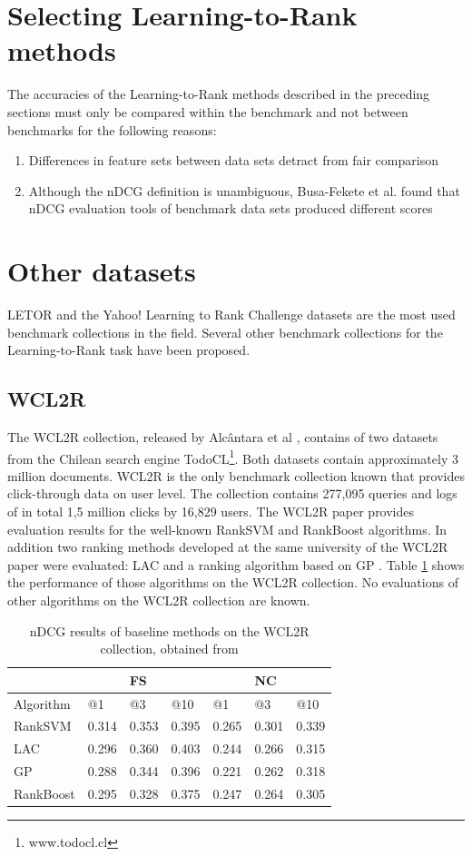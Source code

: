 \section{Selecting Learning-to-Rank methods}
The accuracies of the Learning-to-Rank methods described in the preceding sections must only be compared within the benchmark and not between benchmarks for the following reasons:
\begin{enumerate}
\item Differences in feature sets between data sets detract from fair comparison
\item Although the \ac{nDCG} definition is unambiguous, Busa-Fekete et al. \cite{Busa-Fekete2012} found that \ac{nDCG} evaluation tools of benchmark data sets produced different scores
\end{enumerate}

\section{Other datasets}
LETOR and the Yahoo! Learning to Rank Challenge datasets are the most used benchmark collections in the field. Several other benchmark collections for the Learning-to-Rank task have been proposed.
\subsection{WCL2R}
The WCL2R collection, released by Alc{\^a}ntara et al \cite{Alcantara2010}, contains of two datasets from the Chilean search engine TodoCL\footnote{www.todocl.cl}. Both datasets contain approximately 3 million documents. WCL2R is the only benchmark collection known that provides click-through data on user level. The collection contains 277,095 queries and logs of in total 1,5 million clicks by 16,829 users. The WCL2R paper provides evaluation results for the well-known Rank\ac{SVM} \cite{Herbrich1999,Joachims2002} and RankBoost \cite{Freund2003} algorithms. In addition two ranking methods developed at the same university of the WCL2R paper were evaluated: LAC \cite{Veloso2008} and a ranking algorithm based on \ac{GP} \cite{DeAlmeida2007}. Table \ref{tab:results_WCL2R} shows the performance of those algorithms on the WCL2R collection. No evaluations of other algorithms on the WCL2R collection are known.

\begin{table}
\begin{tabular}{l|lll|lll}
 &  & FS &  &  & NC &  \\ 
\hline
Algorithm & @1 & @3 & @10 & @1 & @3 & @10 \\ 
\hline
RankSVM & 0.314 & 0.353 & 0.395 & 0.265 & 0.301 & 0.339 \\ 
LAC & 0.296 & 0.360 & 0.403 & 0.244 & 0.266 & 0.315 \\ 
GP & 0.288 & 0.344 & 0.396 & 0.221 & 0.262 & 0.318 \\ 
RankBoost & 0.295 & 0.328 & 0.375 & 0.247 & 0.264 & 0.305 \\ 
\end{tabular}
\caption{\acs{nDCG} results of baseline methods on the WCL2R collection, obtained from \cite{Alcantara2010}}
\label{tab:results_WCL2R}
\end{table}

